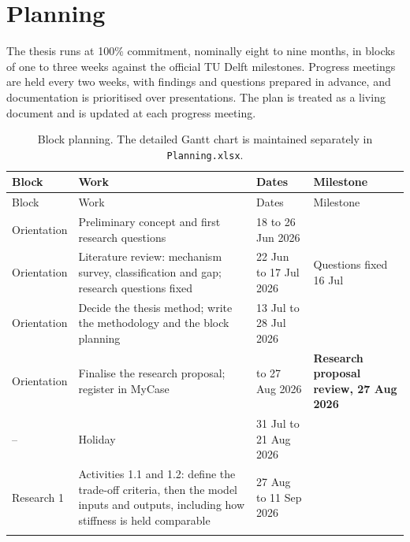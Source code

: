 \chapter{Planning}
\label{chapter:planning}

The thesis runs at 100\% commitment, nominally eight to nine months, in blocks of one to three weeks against the official TU Delft milestones. Progress meetings are held every two weeks, with findings and questions prepared in advance, and documentation is prioritised over presentations. The plan is treated as a living document and is updated at each progress meeting.

{\small
\begin{longtable}{p{1.9cm}p{6.0cm}p{2.5cm}p{3.4cm}}
    \caption{Block planning. The detailed Gantt chart is maintained separately in \texttt{Planning.xlsx}.}
    \label{tab:planning} \\
        \toprule
        Block & Work & Dates & Milestone \\
        \midrule
        \endfirsthead
        \toprule
        Block & Work & Dates & Milestone \\
        \midrule
        \endhead
        
        Orientation & Preliminary concept and first research questions & 18 to 26 Jun 2026 & \\
        \addlinespace
        
        Orientation & Literature review: mechanism survey, classification and gap; research questions fixed & 22 Jun to 17 Jul 2026 & Questions fixed 16 Jul \\
        \addlinespace
        
        Orientation & Decide the thesis method; write the methodology and the block planning & 13 Jul to 28 Jul 2026 & \\
        \addlinespace
        
        Orientation & Finalise the research proposal; register in MyCase & to 27 Aug 2026 & \textbf{Research proposal review, 27 Aug 2026} \\
        \addlinespace
        
        -- & Holiday & 31 Jul to 21 Aug 2026 & \\
        \addlinespace
        
        Research 1 & Activities 1.1 and 1.2: define the trade-off criteria, then the model inputs and outputs, including how stiffness is held comparable & 27 Aug to 11 Sep 2026 & \\
        \addlinespace
        

\end{longtable}}
